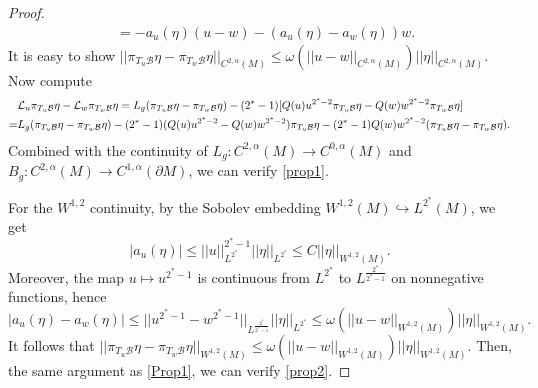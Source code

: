 \documentclass[10pt,a4paper]{amsart}
\newcommand{\B}{\mathcal{B}}
\begin{document}
\begin{proof}
\begin{align*}
       &=-a_u(\eta) (u-w) -(a_u(\eta) -a_w(\eta))w.
   \end{align*}
   It is easy to show $||\pi_{T_u{\B}} \eta -\pi_{T_w{\B}} \eta||_{C^{2,\alpha}(M)} \leq \omega(||u-w||_{C^{2,\alpha}(M)})||\eta||_{C^{2,\alpha}(M)}.$
   Now compute 
   \begin{align} \label{Prop1}
       &\mathcal{L}_u \pi_{T_u{\B}} \eta -\mathcal{L}_w \pi_{T_w{\B}} \eta 
       =L_g (\pi_{T_u{\B}} \eta -\pi_{T_w{\B}} \eta) -(2^*-1)[Q(u)u^{2^*-2}\pi_{T_u{\B}} \eta -Q(w)w^{2^*-2}\pi_{T_w{\B}} \eta] \notag\\
       =&L_g (\pi_{T_u{\B}} \eta -\pi_{T_w{\B}} \eta) -(2^*-1)(Q(u)u^{2^*-2}-Q(w)w^{2^*-2})\pi_{T_u{\B}} \eta - (2^*-1)Q(w)w^{2^*-2}(\pi_{T_u{\B}} \eta -\pi_{T_w{\B}} \eta).
   \end{align}
   Combined with the continuity of $L_g: C^{2,\alpha}(M) \to C^{0,\alpha}(M)$ and $B_g : C^{2,\alpha}(M) \to C^{1,\alpha}(\partial M) $, we can verify \eqref{prop1}.

   For the $W^{1,2} $ continuity, by the Sobolev embedding $W^{1,2} (M) \hookrightarrow L^{2^*}(M)$,
   we get 
   \begin{equation*}
       |a_u(\eta)| \leq ||u||_{L^{2^*}}^{2^*-1} ||\eta ||_{L^{2^*}} \leq C ||\eta ||_{W^{1,2}(M)}.
   \end{equation*}
   Moreover, the map $u \mapsto u^{2^*-1}$ is continuous from $L^{2^*}$ to $L^{\frac{2^*}{2^*-1}
   }$ on nonnegative functions, hence
   \begin{equation*}
       |a_u(\eta)-a_w(\eta)|\leq ||u^{2^*-1}-w^{2^*-1}||_{L^{\frac{2^*}{2^*-1}}}||\eta||_{L^{2^*}}
       \leq \omega(||u-w||_{W^{1,2}(M)}) ||\eta ||_{W^{1,2}(M)}.
   \end{equation*}
   It follows that $||\pi_{T_u{\B}} \eta -\pi_{T_w{\B}} \eta||_{W^{1,2}(M)} \leq \omega(||u-w||_{W^{1,2}(M)})||\eta||_{W^{1,2}(M)}.$
   Then, the same argument as \eqref{Prop1}, we can verify \eqref{prop2}.
   
\end{proof}
\end{document}
